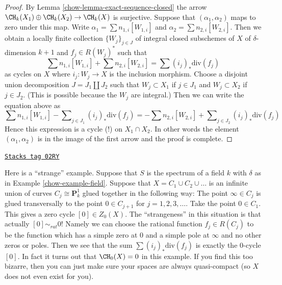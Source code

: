 \begin{proof}

By Lemma \ref{chow-lemma-exact-sequence-closed} the arrow
$\CH_k(X_1) \oplus \CH_k(X_2) \to \CH_k(X)$ is surjective.
Suppose that $(\alpha_1, \alpha_2)$ maps to zero under this map.
Write $\alpha_1 = \sum n_{1, i}[W_{1, i}]$ and
$\alpha_2 = \sum n_{2, i}[W_{2, i}]$. Then we obtain a locally
finite collection $\{W_j\}_{j \in J}$ of integral closed
subschemes of $X$ of $\delta$-dimension $k + 1$ and $f_j \in R(W_j)^*$
such that
$$
\sum n_{1, i}[W_{1, i}] + \sum n_{2, i}[W_{2, i}] = \sum (i_j)_*\text{div}(f_j)
$$
as cycles on $X$ where $i_j : W_j \to X$ is the inclusion morphism.
Choose a disjoint union decomposition $J = J_1 \amalg J_2$ such that
$W_j \subset X_1$ if $j \in J_1$ and $W_j \subset X_2$ if $j \in J_2$.
(This is possible because the $W_j$ are integral.) Then we can write
the equation above as
$$
\sum n_{1, i}[W_{1, i}] - \sum\nolimits_{j \in J_1} (i_j)_*\text{div}(f_j) =
- \sum n_{2, i}[W_{2, i}] + \sum\nolimits_{j \in J_2} (i_j)_*\text{div}(f_j)
$$
Hence this expression is a cycle (!) on $X_1 \cap X_2$. In other words
the element $(\alpha_1, \alpha_2)$ is in the image of the first arrow
and the proof is complete.
\end{proof}

\begin{example}[Weird]
\label{chow-example-weird}
\href{https://stacks.math.columbia.edu/tag/02RY}{\texttt{Stacks tag 02RY}}

Here is a ``strange'' example.
Suppose that $S$ is the spectrum of a field $k$
with $\delta$ as in Example \ref{chow-example-field}.
Suppose that $X = C_1 \cup C_2 \cup \ldots$ is an infinite
union of curves $C_j \cong \mathbf{P}^1_k$ glued together
in the following way: The point $\infty \in C_j$ is glued
transversally to the point $0 \in C_{j + 1}$ for $j = 1, 2, 3, \ldots$.
Take the point $0 \in C_1$. This gives a zero cycle
$[0] \in Z_0(X)$. The ``strangeness'' in this situation is
that actually $[0] \sim_{rat} 0$! Namely we can choose
the rational function $f_j \in R(C_j)$ to be the function
which has a simple zero at $0$ and a simple pole at $\infty$
and no other zeros or poles. Then we see that the sum
$\sum (i_j)_*\text{div}(f_j)$ is exactly the $0$-cycle
$[0]$. In fact it turns out that $\CH_0(X) = 0$ in this example.
If you find this too bizarre, then you can just
make sure your spaces are always quasi-compact
(so $X$ does not even exist for you).
\end{example}

